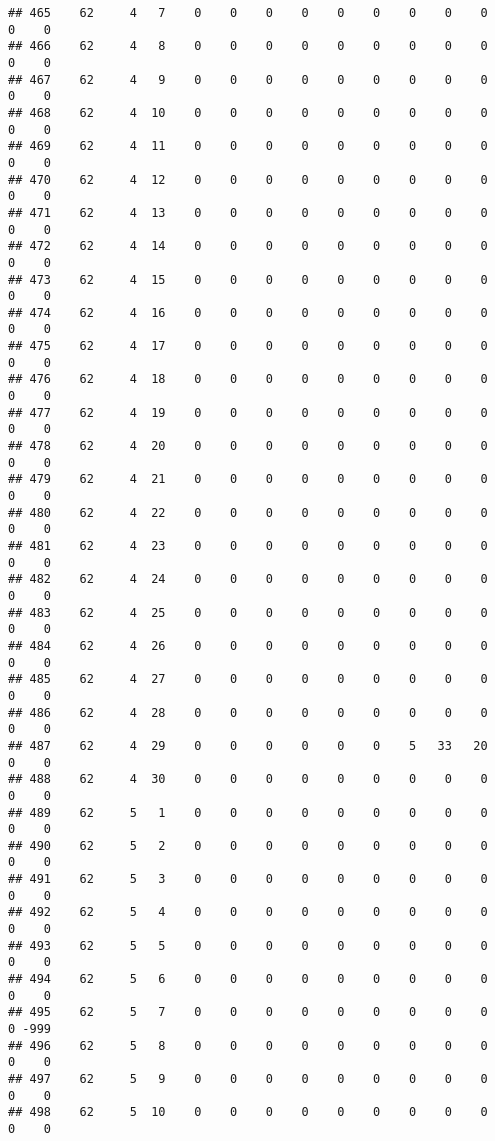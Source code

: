 \documentclass[]{article}
\begin{document}
\begin{verbatim}
## 465    62     4   7    0    0    0    0    0    0    0    0    0    0    0
## 466    62     4   8    0    0    0    0    0    0    0    0    0    0    0
## 467    62     4   9    0    0    0    0    0    0    0    0    0    0    0
## 468    62     4  10    0    0    0    0    0    0    0    0    0    0    0
## 469    62     4  11    0    0    0    0    0    0    0    0    0    0    0
## 470    62     4  12    0    0    0    0    0    0    0    0    0    0    0
## 471    62     4  13    0    0    0    0    0    0    0    0    0    0    0
## 472    62     4  14    0    0    0    0    0    0    0    0    0    0    0
## 473    62     4  15    0    0    0    0    0    0    0    0    0    0    0
## 474    62     4  16    0    0    0    0    0    0    0    0    0    0    0
## 475    62     4  17    0    0    0    0    0    0    0    0    0    0    0
## 476    62     4  18    0    0    0    0    0    0    0    0    0    0    0
## 477    62     4  19    0    0    0    0    0    0    0    0    0    0    0
## 478    62     4  20    0    0    0    0    0    0    0    0    0    0    0
## 479    62     4  21    0    0    0    0    0    0    0    0    0    0    0
## 480    62     4  22    0    0    0    0    0    0    0    0    0    0    0
## 481    62     4  23    0    0    0    0    0    0    0    0    0    0    0
## 482    62     4  24    0    0    0    0    0    0    0    0    0    0    0
## 483    62     4  25    0    0    0    0    0    0    0    0    0    0    0
## 484    62     4  26    0    0    0    0    0    0    0    0    0    0    0
## 485    62     4  27    0    0    0    0    0    0    0    0    0    0    0
## 486    62     4  28    0    0    0    0    0    0    0    0    0    0    0
## 487    62     4  29    0    0    0    0    0    0    5   33   20    0    0
## 488    62     4  30    0    0    0    0    0    0    0    0    0    0    0
## 489    62     5   1    0    0    0    0    0    0    0    0    0    0    0
## 490    62     5   2    0    0    0    0    0    0    0    0    0    0    0
## 491    62     5   3    0    0    0    0    0    0    0    0    0    0    0
## 492    62     5   4    0    0    0    0    0    0    0    0    0    0    0
## 493    62     5   5    0    0    0    0    0    0    0    0    0    0    0
## 494    62     5   6    0    0    0    0    0    0    0    0    0    0    0
## 495    62     5   7    0    0    0    0    0    0    0    0    0    0 -999
## 496    62     5   8    0    0    0    0    0    0    0    0    0    0    0
## 497    62     5   9    0    0    0    0    0    0    0    0    0    0    0
## 498    62     5  10    0    0    0    0    0    0    0    0    0    0    0

\end{verbatim}
\end{document}
